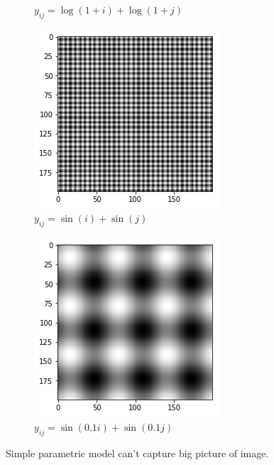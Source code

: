 \documentclass{article}
\begin{document}
\begin{figure}[htb]
\begin{subfigure}[b]{0.24\linewidth}
    \caption{$y_{ij} = \log(1+i)+\log(1+j)$}
  \end{subfigure}
  \begin{subfigure}[b]{0.24\linewidth}
    \includegraphics[width=\linewidth]{images/parametric_model_3.png}
    \caption{$y_{ij} = \sin(i)+\sin(j)$}
  \end{subfigure}
  \begin{subfigure}[b]{0.24\linewidth}
    \includegraphics[width=\linewidth]{images/parametric_model_4.png}
    \caption{$y_{ij} = \sin(0.1i)+\sin(0.1j)$}
  \end{subfigure}
  \caption{Simple parametric model can't capture big picture of image.}
  \label{fig:parametric_model}
\end{figure}
\end{document}
